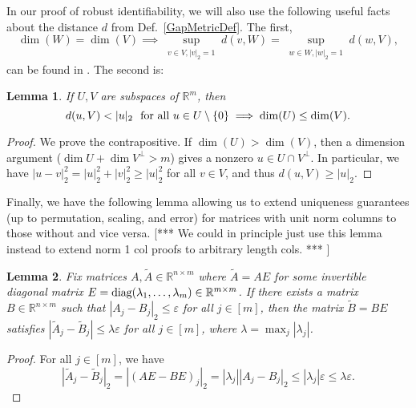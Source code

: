 \documentclass[journal, onecolumn]{IEEEtran}
\newtheorem{lemma}{Lemma}
\begin{document}
In our proof of robust identifiability, we will also use the following useful facts about the distance $d$ from Def.~\ref{GapMetricDef}. The first, 
\begin{equation}\label{SubspaceMetricSameDim}
\dim(W) = \dim(V) \implies \sup_{\substack{v \in V, |v|_2 = 1}}  d(v,W)  = \sup_{\substack{w \in W, |w|_2 = 1}} d(w,V),
\end{equation}
can be found in \cite[Lemma 3.3]{Morris10}. The second is:
\begin{lemma}\label{MinDimLemma}
If $U, V$ are subspaces of $\mathbb{R}^{m}$, then
\begin{equation}\label{MinDim}
d(u,V) < |u|_2 \ \ \text{\rm for all } u \in U \setminus{\{0\}} \implies \dim(U) \leq \dim(V).
\end{equation}
\end{lemma}

\begin{proof}
We prove the contrapositive.  If $\dim(U) > \dim(V)$, then a dimension argument ($\dim U + \dim V^\perp > m$) gives a nonzero $u \in U \cap V^\perp$.  In particular, we have $|u - v|_2^2 = |u|_2^2 + |v|_2^2 \geq |u|_2^2$ for all $v \in V$, and thus $d(u,V) \geq |u|_2$.
\end{proof}

Finally, we have the following lemma allowing us to extend uniqueness guarantees (up to permutation, scaling, and error) for matrices with unit norm columns to those without and vice versa.  [*** We could in principle just use this lemma instead to extend norm 1 col proofs to arbitrary length cols. *** ]
\begin{lemma}\label{NormalizedDictionaryLemma}
Fix matrices $A, \tilde{A} \in \mathbb{R}^{n \times m}$ where $\tilde{A} = AE$ for some invertible diagonal matrix $E = \text{\rm diag}(\lambda_1,\ldots,\lambda_m) \in \mathbb{R}^{m \times m}$. If there exists a matrix $B \in \mathbb{R}^{n \times m}$ such that $|A_j - B_j|_2 \leq \varepsilon$ for all $j \in [m]$, then the matrix $\tilde{B} = BE$ satisfies $|\tilde{A}_j - \tilde{B}_j| \leq \lambda \varepsilon$ for all $j \in [m]$, where $\lambda = \max_j |\lambda_j|$.
\end{lemma}
\begin{proof}
For all $j \in [m]$, we have
\[|\tilde{A}_j - \tilde{B}_j|_2 = |(AE-BE)_j|_2 = |\lambda_j| |A_j- B_j|_2 \leq |\lambda_j| \varepsilon \leq \lambda \varepsilon.\]
\end{proof}

 
\end{document}
